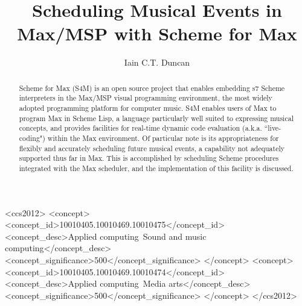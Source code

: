 \documentclass[acmsmall]{acmart}
\begin{document}
\title{Scheduling Musical Events in Max/MSP with Scheme for Max}

\author{Iain C.T. Duncan}


\renewcommand{\shortauthors}{Duncan}

\begin{abstract}
Scheme for Max (S4M) is an open source project that enables embedding 
s7 Scheme interpreters in the Max/MSP visual programming environment,
the most widely adopted programming platform for computer music.
S4M enables users of Max to program Max in Scheme Lisp, a language particularly 
well suited to expressing musical concepts, and provides facilities for 
real-time dynamic code evaluation (a.k.a. ``live-coding") within the
Max environment. Of particular note is its appropriateness for flexibly
and accurately scheduling future musical events, a capability not
adequately supported thus far in Max. This is accomplished by scheduling
Scheme procedures integrated with the Max scheduler, and the 
implementation of this facility is discussed.

\end{abstract}


\begin{CCSXML}
<ccs2012>
<concept>
<concept_id>10010405.10010469.10010475</concept_id>
<concept_desc>Applied computing~Sound and music computing</concept_desc>
<concept_significance>500</concept_significance>
</concept>
<concept>
<concept_id>10010405.10010469.10010474</concept_id>
<concept_desc>Applied computing~Media arts</concept_desc>
<concept_significance>500</concept_significance>
</concept>
</ccs2012>
\end{CCSXML}
\end{document}
